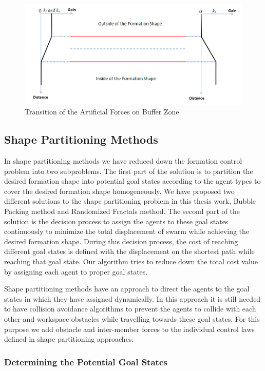 \begin{figure}[H]
\caption{Transition of the Artificial Forces on Buffer Zone}
\centering
\includegraphics[scale = 0.50]{buffer_zone}
\end{figure}
					
\subsection{Shape Partitioning Methods} \label{shapepartition_ref}
In shape partitioning methods we have reduced down the formation control problem into two subproblems. The first part of the solution is to partition the desired formation shape into potential goal states according to the agent types to cover the desired formation shape homogeneously. We have proposed two different solutions to the shape partitioning problem in this thesis work, Bubble Packing method and Randomized Fractals method. The second part of the solution is the decision process to assign the agents to these goal states continuously to minimize the total displacement of swarm while achieving the desired formation shape. During this decision process, the cost of reaching different goal states is defined with the displacement on the shortest path while reaching that goal state. Our algorithm tries to reduce down the total cost value by assigning each agent to proper goal states.

Shape partitioning methods have an approach to direct the agents to the goal states in which they have assigned dynamically. In this approach it is still needed to have collision avoidance algorithms to prevent the agents to collide with each other and workspace obstacles while travelling towards these goal states. For this purpose we add obstacle and inter-member forces to the individual control laws defined in shape partitioning approaches.
			
\subsubsection{Determining the Potential Goal States} \label{Partitioning_ref}
